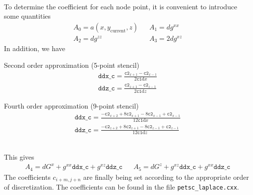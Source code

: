 \documentclass[12pt]{article}
\begin{document}
%
\\ To determine the coefficient for each node point, it is convenient to
introduce some quantities
%
\begin{align*}
    &A_0 = a(x,y_{\text{current}},z)& &A_1 = dg^{xx}&\\ &A_2 = dg^{zz}& &A_3 =
    2dg^{xz}&
\end{align*}
%
In addition, we have\\
%
\begin{minipage}{0.45\textwidth}
Second order approximation (5-point stencil)
%
\begin{align*}
    \texttt{ddx\_c} = \frac{\texttt{c2}_{x+1} - \texttt{c2}_{x-1} }{
    2\texttt{c1}\text{d}x}\\
    \texttt{ddz\_c} = \frac{\texttt{c2}_{z+1} - \texttt{c2}_{z-1} }{
    2\texttt{c1}\text{d}z}
\end{align*}
%
\end{minipage}
%
\hspace{1cm}
%
\begin{minipage}{0.45\textwidth}
    Fourth order approximation (9-point stencil)
%
\begin{align*}
    \texttt{ddx\_c} = \frac{-\texttt{c2}_{x+2} + 8\texttt{c2}_{x+1} -
    8\texttt{c2}_{x-1} + \texttt{c2}_{x-1} }{ 12\texttt{c1}\text{d}x}\\
    \texttt{ddz\_c} = \frac{-\texttt{c2}_{z+2} + 8\texttt{c2}_{z+1} -
    8\texttt{c2}_{z-1} + \texttt{c2}_{z-1} }{ 12\texttt{c1}\text{d}z}
\end{align*}
%
\end{minipage}
%
\\
%
This gives
%
\begin{align*}
    &A_4 = dG^x + g^{xx}\texttt{ddx\_c} + g^{xz}\texttt{ddz\_c}& &A_5 = dG^z +
    g^{xz}\texttt{ddx\_c} + g^{xx}\texttt{ddz\_c}&
\end{align*}
%
The coefficients $c_{i+m,j+n}$ are finally being set according to the
appropriate order of discretization. The coefficients can be found in the file
\texttt{petsc\_laplace.cxx}.
\end{document}
